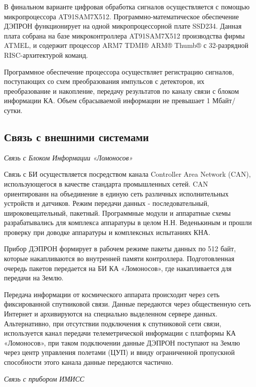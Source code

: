 \documentclass[a4paper,portrait,12pt]{article}
\begin{document}
{{{{В финальном варианте цифровая обработка сигналов осуществляется с помощью микропроцессора AT91SAM7X512. Программно-математическое обеспечение ДЭПРОН функционирует на одной микропроцессорной плате SSD234. Данная плата собрана на базе микроконтроллера AT91SAM7X512 производства фирмы ATMEL, и содержит процессор ARM7 TDMI® ARM® Thumb® с 32-разрядной RISC-архитектурой команд.


Программное обеспечение процессора осуществляет регистрацию сигналов, поступающих со схем преобразования импульсов с детекторов, их преобразование и накопление, передачу результатов по каналу связи с блоком информации КА. Объем сбрасываемой информации не превышает 1 Мбайт/сутки.





\subsection*{	\textbf{Связь с }\textbf{внешними системами}}

\emph{Связь с Блоком Информации «Ломоносов»}


Связь с БИ осуществляется посредством канала Controller Area Network (CAN), использующегося в качестве стандарта промышленных сетей. CAN ориентированн на объединение в единую сеть различных исполнительных устройств и датчиков. Режим передачи данных - последовательный, широковещательный, пакетный. Программные модули и аппаратные схемы разрабатывались для комплекса аппаратуры в целом Н.Н. Веденькиным и прошли проверку при доводке аппаратуры и комплексных испытаниях КНА.


Прибор ДЭПРОН формирует в рабочем режиме пакеты данных по 512 байт, которые накапливаются во внутренней памяти контроллера. Подготовленная очередь пакетов  передается на БИ КА «Ломоносов», где накапливается для передачи на Землю.


Передача информации от космического аппарата происходит через сеть фиксированной спутниковой связи. Данные передаются через общественную сеть Интернет и архивируются на специально выделенном сервере данных. Альтернативно, при отсутствии подключения к спутниковой сети связи, используется канал передачи телеметрической информации с платформы КА «Ломоносов», при таком подключении данные ДЭПРОН поступают на Землю через центр управления полетами (ЦУП) и ввиду ограниченной пропускной способности этого канала данные передаются частично.


\emph{Связь с прибором ИМИСС}


}}}}
\end{document}
